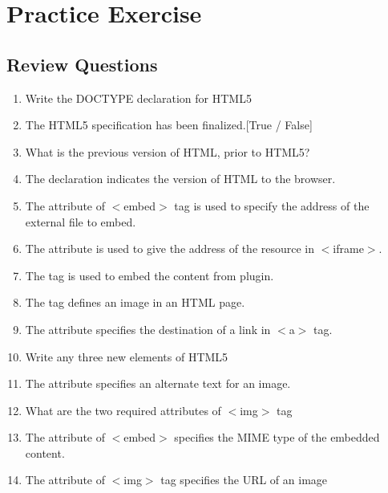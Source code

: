 \documentclass[11pt,a4paper]{article}
\begin{document}
\section*{Practice Exercise}
\subsection*{Review Questions}
\begin{enumerate}\itemsep10pt
\item Write the DOCTYPE declaration for HTML5 \underline{\hspace{3cm}}
\item The HTML5 specification has been finalized.[True / False]
\item What is the previous version of HTML, prior to HTML5? \underline{\hspace{3cm}}
\item The \underline{\hspace{3cm}} declaration indicates the version of HTML to the browser.
\item The \underline{\hspace{2cm}} attribute of $<$embed$>$ tag is used to specify the address of the external file to embed.
\item The \underline{\hspace{2cm}} attribute is used to give the address of the resource in $<$iframe$>$.
\item The \underline{\hspace{2cm}} tag is used to embed the content from plugin.
\item The \underline{\hspace{3cm}} tag defines an image in an HTML page.
\item The \underline{\hspace{2cm}} attribute specifies the destination of a link in $<$a$>$ tag.
\item Write any three new elements of HTML5 \underline{\hspace{3cm}}
\item The \underline{\hspace{2cm}} attribute specifies an alternate text for an image.
\item What are the two required attributes of $<$img$>$ tag \underline{\hspace{2cm}}
\item The \underline{\hspace{2cm}} attribute of $<$embed$>$ specifies the MIME type of the embedded content.
\item The \underline{\hspace{2cm}} attribute of $<$img$>$ tag specifies the URL of an image
\end{enumerate}
\end{document}
